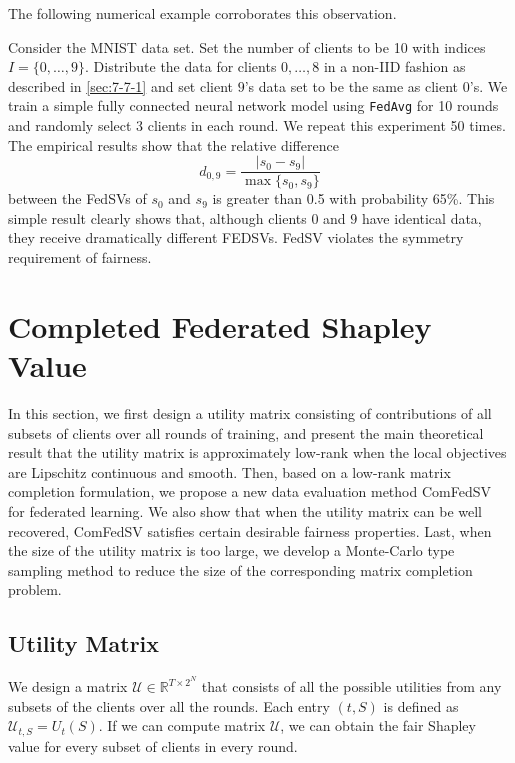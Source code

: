 The following numerical example corroborates this observation.

\begin{example} \label{ex:unfair}
    Consider the MNIST data set. Set the number of clients to be 10 with indices $I = \{0, \dots, 9\}$. Distribute the data for clients $0, \dots, 8$ in a non-IID fashion as described in \autoref{sec:7-7-1} and set client $9$'s data set to be the same as client $0$'s. We train a simple fully connected neural network model using \texttt{FedAvg} for 10 rounds and randomly select 3 clients in each round. We repeat this experiment 50 times. The empirical results show that the relative difference 
    \begin{equation} \label{eq:relative_difference}
            d_{0,9} = \frac{|s_0 - s_9|}{\max\{s_0, s_9\}}
    \end{equation}
    between the FedSVs of $s_0$ and $s_{9}$ is greater than 0.5 with probability 65\%. This simple result clearly shows that, although clients $0$ and $9$ have identical data, they receive dramatically different FEDSVs. FedSV violates the symmetry requirement of fairness.  
\end{example}


\section{Completed Federated Shapley Value} \label{sec:7-6}

In this section, we first design a utility matrix consisting of contributions of all subsets of clients over all rounds of training, and present the main theoretical result that the utility matrix is approximately low-rank when the local objectives are Lipschitz continuous and smooth. Then, based on a low-rank matrix completion formulation, we propose a new data evaluation method ComFedSV for federated learning. We also show that when the utility matrix can be well recovered, ComFedSV satisfies certain desirable fairness properties. Last, when the size of the utility matrix is too large, we develop a Monte-Carlo type sampling method to reduce the size of the corresponding matrix completion problem.

\subsection{Utility Matrix} \label{sec:7-6-1}
We design a matrix $\mathcal{U} \in \mathbb{R}^{T \times 2^N}$ that consists of all the possible utilities from any subsets of the clients over all the rounds. Each entry $(t, S)$ is defined as 
$\mathcal{U}_{t, S} = U_t(S)$. If we can compute matrix $\mathcal{U}$, we can obtain the fair Shapley value for every subset of clients in every round.

